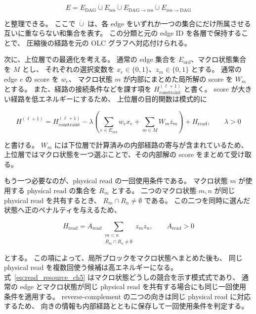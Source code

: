 \documentclass[a4j,10pt]{ujarticle}
\begin{document}
\begin{equation}
E
=
E_{\mathrm{DAG}}
\dot\cup
E_{\mathrm{res}}
\dot\cup
E_{\mathrm{DAG}\rightarrow\mathrm{res}}
\dot\cup
E_{\mathrm{res}\rightarrow\mathrm{DAG}}
\label{eq:edge_partition_ch5}
\end{equation}

と整理できる。
ここで $\dot\cup$ は、各 edge をいずれか一つの集合にだけ所属させる
互いに重ならない和集合を表す。
この分類と元の edge ID を各層で保持することで、
圧縮後の経路を元の OLC グラフへ対応付けられる。

次に、上位層での最適化を考える。
通常の edge 集合を $E_{\mathrm{ord}}$、マクロ状態集合を $M$ とし、
それぞれの選択変数を $x_e\in\{0,1\}$、$z_m\in\{0,1\}$ とする。
通常の edge $e$ の score を $w_e$、
マクロ状態 $m$ が内部にまとめた局所解の score を $W_m$ とする。
また、経路の接続条件などを課す項を
$H_{\mathrm{constraint}}^{(\ell+1)}$ と書く。
score が大きい経路を低エネルギーにするため、
上位層の目的関数は模式的に

\begin{equation}
H^{(\ell+1)}
=
H_{\mathrm{constraint}}^{(\ell+1)}
-
\lambda
\left(
\sum_{e\in E_{\mathrm{ord}}}w_e x_e
+
\sum_{m\in M}W_m z_m
\right)
+
H_{\mathrm{read}},
\qquad \lambda>0
\label{eq:upper_layer_ch5}
\end{equation}

と書ける。
$W_m$ には下位層で計算済みの内部経路の寄与が含まれているため、
上位層ではマクロ状態を一つ選ぶことで、その内部解の score をまとめて受け取る。

もう一つ必要なのが、physical read の一回使用条件である。
マクロ状態 $m$ が使用する physical read の集合を $R_m$ とする。
二つのマクロ状態 $m,n$ が同じ physical read を共有するとき、
$R_m\cap R_n\neq\emptyset$ である。
この二つを同時に選んだ状態へ正のペナルティを与えるため、

\begin{equation}
H_{\mathrm{read}}
=
A_{\mathrm{read}}
\sum_{\substack{m<n\\R_m\cap R_n\neq\emptyset}}
z_mz_n,
\qquad A_{\mathrm{read}}>0
\label{eq:read_resource_ch5}
\end{equation}

とする。
この項によって、局所ブロックをマクロ状態へまとめた後も、
同じ physical read を複数回使う候補は高エネルギーになる。
式~\eqref{eq:read_resource_ch5} はマクロ状態どうしの競合を示す模式式であり、
通常の edge とマクロ状態が同じ physical read を共有する場合にも同じ一回使用条件を適用する。
reverse-complement の二つの向きは同じ physical read に対応するため、
向きの情報も内部経路とともに保存して一回使用条件を判定する。
\end{document}
